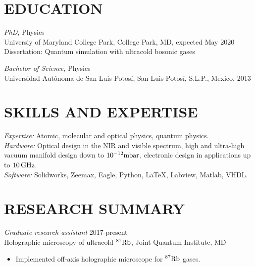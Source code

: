 \documentclass[margin, 10pt]{res} %
\begin{document}
\begin{resume}


\section{EDUCATION}

{\sl PhD,} Physics \\
Universiy of Maryland College Park, College Park, MD, expected May 2020 \\
Dissertation: Quantum simulation with ultracold bosonic gases

{\sl Bachelor of Science,} Physics \\
Universidad Aut\'onoma de San Luis Potos\'i, San Luis Potos\'i, S.L.P., Mexico, 2013
 

\section{SKILLS AND EXPERTISE}

{\sl Expertise:}
Atomic, molecular and optical physics, quantum physics.\\
{\sl Hardware:}
Optical design in the NIR and visible spectrum, high and ultra-high vacuum manifold design down to ${10^{-12} {\rm mbar}}$, electronic design in applications up to ${10 \, {\rm GHz}}$.\\
{\sl Software:}
Solidworks, Zeemax, Eagle, Python, \LaTeX, Labview, Matlab, VHDL.

 
\section{RESEARCH SUMMARY}

{\sl Graduate research assistant} \hfill 2017-present \\
Holographic microscopy of ultracold ${^{87} {\rm Rb}}$, Joint Quantum Institute, MD
\begin{itemize} \itemsep -2pt
\item Implemented off-axis holographic microscope for ${^{87} {\rm Rb}}$ gases.
\end{itemize} 


\end{resume}
\end{document}
